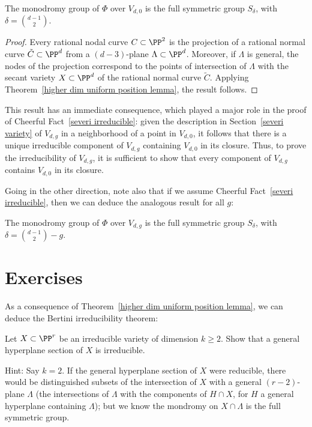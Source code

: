\begin{proposition}
The monodromy group of $\Phi$ over $V_{d,0}$ is the full symmetric group $S_\delta$, with $\delta = \binom{d-1}{2}$.
\end{proposition}

\begin{proof}
Every rational nodal curve $C \subset \PP^2$ is the projection of a rational normal curve $\tilde C \subset \PP^d$ from a $(d-3)$-plane $\Lambda \subset \PP^d$. Moreover, if $\Lambda$ is general,  the nodes of the projection correspond to the points of intersection of $\Lambda$ with the  secant variety $X \subset \PP^d$ of the rational normal curve $\tilde C$. Applying Theorem~\ref{higher dim uniform position lemma}, the result follows.
\end{proof}

This result has an immediate consequence, which played a major role in the proof of Cheerful Fact~\ref{severi irreducible}: given the description in Section~\ref{severi variety} of $V_{d,g}$ in a neighborhood of a point in $V_{d,0}$, it follows that there is a unique irreducible component of $V_{d,g}$ containing $V_{d,0}$ in its closure. Thus, to prove the irreducibility of $V_{d,g}$, it is sufficient to show that every component of $V_{d,g}$ contains $V_{d,0}$ in its closure. 

Going in the other direction, note also that if we assume Cheerful Fact~\ref{severi irreducible}, then we can deduce the analogous result for all $g$:


\begin{proposition}
The monodromy group of $\Phi$ over $V_{d,g}$ is the full symmetric group $S_\delta$, with $\delta = \binom{d-1}{2} - g$.
\end{proposition}



\section{Exercises}

As a consequence of Theorem~\ref{higher dim uniform position lemma}, we can deduce the Bertini irreducibility theorem:

\begin{exercise}
Let $X \subset \PP^r$ be an irreducible variety of dimension $k \geq 2$. Show that a general hyperplane section of $X$ is irreducible.

Hint: Say $k=2$. If the general hyperplane section of $X$ were reducible, there would be distinguished subsets of the intersection of $X$ with a general $(r-2)$-plane $\Lambda$ (the intersections of $\Lambda$ with the components of $H \cap X$, for $H$ a general hyperplane containing $\Lambda$); but we know the mondromy on $X \cap \Lambda$ is the full symmetric group.
\end{exercise}

